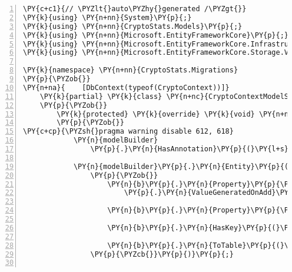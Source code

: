 \def\PYZbs{\char`\\}
\def\PYZus{\char`\_}
\def\PYZob{\char`\{}
\def\PYZcb{\char`\}}
\def\PYZca{\char`\^}
\def\PYZam{\char`\&}
\def\PYZlt{\char`\<}
\def\PYZgt{\char`\>}
\def\PYZsh{\char`\#}
\def\PYZpc{\char`\%}
\def\PYZdl{\char`\$}
\def\PYZhy{\char`\-}
\def\PYZsq{\char`\'}
\def\PYZdq{\char`\"}
\def\PYZti{\char`\~}
\def\PYZat{@}
\def\PYZlb{[}
\def\PYZrb{]}
\makeatother\begin{Verbatim}[commandchars=\\\{\},numbers=left,firstnumber=1,stepnumber=1,numberblanklines=0]
\PY{c+c1}{// \PYZlt{}auto\PYZhy{}generated /\PYZgt{}}
\PY{k}{using} \PY{n+nn}{System}\PY{p}{;}
\PY{k}{using} \PY{n+nn}{CryptoStats.Models}\PY{p}{;}
\PY{k}{using} \PY{n+nn}{Microsoft.EntityFrameworkCore}\PY{p}{;}
\PY{k}{using} \PY{n+nn}{Microsoft.EntityFrameworkCore.Infrastructure}\PY{p}{;}
\PY{k}{using} \PY{n+nn}{Microsoft.EntityFrameworkCore.Storage.ValueConversion}\PY{p}{;}

\PY{k}{namespace} \PY{n+nn}{CryptoStats.Migrations}
\PY{p}{\PYZob{}}
\PY{n+na}{    [DbContext(typeof(CryptoContext))]}
    \PY{k}{partial} \PY{k}{class} \PY{n+nc}{CryptoContextModelSnapshot} \PY{p}{:} \PY{n}{ModelSnapshot}
    \PY{p}{\PYZob{}}
        \PY{k}{protected} \PY{k}{override} \PY{k}{void} \PY{n+nf}{BuildModel}\PY{p}{(}\PY{n}{ModelBuilder} \PY{n}{modelBuilder}\PY{p}{)}
        \PY{p}{\PYZob{}}
\PY{c+cp}{\PYZsh{}pragma warning disable 612, 618}
            \PY{n}{modelBuilder}
                \PY{p}{.}\PY{n}{HasAnnotation}\PY{p}{(}\PY{l+s}{\PYZdq{}ProductVersion\PYZdq{}}\PY{p}{,} \PY{l+s}{\PYZdq{}2.1.0\PYZhy{}rc1\PYZhy{}32029\PYZdq{}}\PY{p}{)}\PY{p}{;}

            \PY{n}{modelBuilder}\PY{p}{.}\PY{n}{Entity}\PY{p}{(}\PY{l+s}{\PYZdq{}CryptoStats.Models.Exchange\PYZdq{}}\PY{p}{,} \PY{n}{b} \PY{p}{=}\PY{p}{\PYZgt{}}
                \PY{p}{\PYZob{}}
                    \PY{n}{b}\PY{p}{.}\PY{n}{Property}\PY{p}{\PYZlt{}}\PY{k+kt}{int}\PY{p}{\PYZgt{}}\PY{p}{(}\PY{l+s}{\PYZdq{}ExchangeId\PYZdq{}}\PY{p}{)}
                        \PY{p}{.}\PY{n}{ValueGeneratedOnAdd}\PY{p}{(}\PY{p}{)}\PY{p}{;}

                    \PY{n}{b}\PY{p}{.}\PY{n}{Property}\PY{p}{\PYZlt{}}\PY{k+kt}{string}\PY{p}{\PYZgt{}}\PY{p}{(}\PY{l+s}{\PYZdq{}Name\PYZdq{}}\PY{p}{)}\PY{p}{;}

                    \PY{n}{b}\PY{p}{.}\PY{n}{HasKey}\PY{p}{(}\PY{l+s}{\PYZdq{}ExchangeId\PYZdq{}}\PY{p}{)}\PY{p}{;}

                    \PY{n}{b}\PY{p}{.}\PY{n}{ToTable}\PY{p}{(}\PY{l+s}{\PYZdq{}Exchanges\PYZdq{}}\PY{p}{)}\PY{p}{;}
                \PY{p}{\PYZcb{}}\PY{p}{)}\PY{p}{;}


\end{Verbatim}
